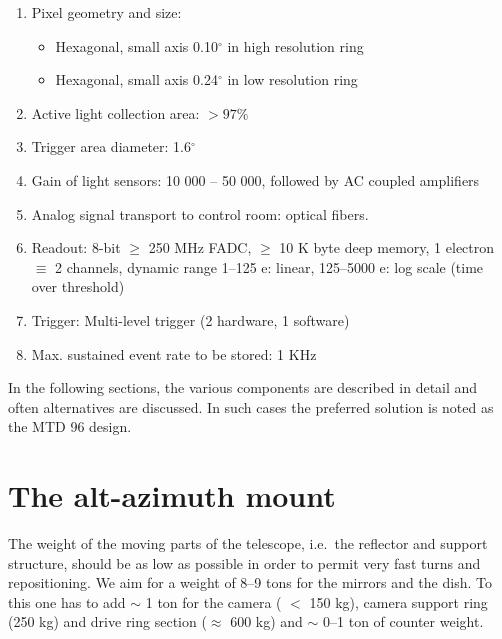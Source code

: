 \begin{enumerate}
\item  Pixel geometry and size:

\begin{itemize}
\item  Hexagonal, small axis 0.10$^{\circ }$ in high resolution ring

\item  Hexagonal, small axis 0.24$^{\circ }$ in low resolution ring
\end{itemize}

\item  Active light collection area: $>97\%$

\item  Trigger area diameter: 1.6$^{\circ }$

\item  Gain of light sensors: 10 000 -- 50 000, followed by AC coupled
amplifiers

\item  Analog signal transport to control room: optical fibers.

\item  Readout: 8-bit $\geq $ 250 MHz FADC, $\geq$ 10 K byte deep memory, 1
electron $\equiv $ 2 channels, dynamic range 1--125 e: linear, 125--5000 e:
log scale (time over threshold)

\item  Trigger: Multi-level trigger (2 hardware, 1 software)

\item  Max. sustained event rate to be stored: 1 KHz
\end{enumerate}

In the following sections, the various components are described in detail
and often alternatives are discussed. In such cases the preferred solution
is noted as the MTD 96 design.
\setcounter{chapter}{4}

\section{The alt-azimuth mount}


\medskip The weight of the moving parts of the telescope, i.e.\ the reflector 
and support structure, should be as low as possible in order to permit very
fast turns and repositioning. We aim for a weight of 8--9 tons for the
mirrors and the dish. To this one has to add $\sim$ 1 ton for the camera ( $%
< $ 150 kg), camera support ring (250 kg) and drive ring section ($\approx$
600 kg) and $\sim$ 0--1 ton of counter weight.

